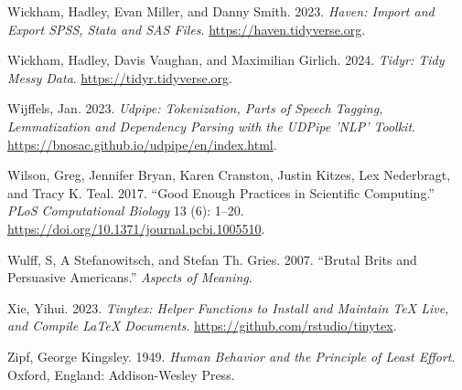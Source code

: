\documentclass[
  letterpaper,
]{latex/krantz}
\newlength{\cslhangindent}
\newenvironment{CSLReferences}[2] %
 {\begin{list}{}{%
  \setlength{\itemindent}{0pt}
  \setlength{\leftmargin}{0pt}
  \setlength{\parsep}{0pt}
  \ifodd #1
   \setlength{\leftmargin}{\cslhangindent}
   \setlength{\itemindent}{-1\cslhangindent}
  \fi
  \setlength{\itemsep}{#2\baselineskip}}}
 {\end{list}}
\theoremstyle{definition}
\theoremstyle{remark}
\begin{document}
\begin{CSLReferences}{1}{0}
Wickham, Hadley, Evan Miller, and Danny Smith. 2023. \emph{Haven: Import
and Export SPSS, Stata and SAS Files}.
\url{https://haven.tidyverse.org}.

Wickham, Hadley, Davis Vaughan, and Maximilian Girlich. 2024.
\emph{Tidyr: Tidy Messy Data}. \url{https://tidyr.tidyverse.org}.

Wijffels, Jan. 2023. \emph{Udpipe: Tokenization, Parts of Speech
Tagging, Lemmatization and Dependency Parsing with the UDPipe 'NLP'
Toolkit}. \url{https://bnosac.github.io/udpipe/en/index.html}.

Wilson, Greg, Jennifer Bryan, Karen Cranston, Justin Kitzes, Lex
Nederbragt, and Tracy K. Teal. 2017. {``Good Enough Practices in
Scientific Computing.''} \emph{PLoS Computational Biology} 13 (6):
1--20. \url{https://doi.org/10.1371/journal.pcbi.1005510}.

Wulff, S, A Stefanowitsch, and Stefan Th. Gries. 2007. {``Brutal Brits
and Persuasive Americans.''} \emph{Aspects of Meaning}.

Xie, Yihui. 2023. \emph{Tinytex: Helper Functions to Install and
Maintain TeX Live, and Compile LaTeX Documents}.
\url{https://github.com/rstudio/tinytex}.

Zipf, George Kingsley. 1949. \emph{Human Behavior and the Principle of
Least Effort}. Oxford, England: Addison-Wesley Press.

\end{CSLReferences}



\printindex
\end{document}
